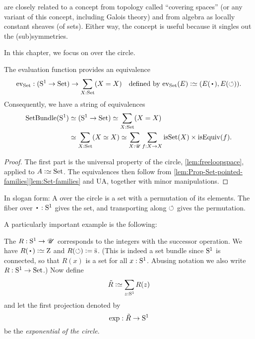 \begin{remark}
  \Coverings are closely related to a concept from topology called ``covering spaces''
(or any variant of this concept, including Galois theory) and from algebra as locally constant sheaves (of sets).
Either way, the concept is useful because it singles out the (sub)symmetries.
\end{remark}

In this chapter, we focus on \coverings over the circle.

\begin{theorem}\label{thm:coveringsofS1perms}
  The evaluation function provides an equivalence
  \[
    \ev_\Set : (\Sc \to \Set) \to \sum_{X:\Set}(X=X)
    \quad\text{defined by $\ev_\Set(E) \defeq (E(\base),E(\Sloop))$.}
  \]
  Consequently, we have a string of equivalences
  \begin{align*}
    \SetBundle(\Sc)
    &\equiv (\Sc \to \Set)
      \equiv \sum_{X:\Set}(X=X) \\
    &\equiv \sum_{X:\Set}(X\equiv X)
    \equiv \sum_{X:\UU}\sum_{f:X\to X}
    \isset(X) \times \isEq(f).
  \end{align*}
\end{theorem}
\begin{proof}
  The first part is the universal property of the circle,
  \cref{lem:freeloopspace}, applied to $A\defeq\Set$.
  The equivalences then follow from \cref{lem:Prop-Set-pointed-families}\ref{lem:Set-families} and UA,
  together with minor manipulations.
\end{proof}
In slogan form: A \covering over the circle is a set with a permutation of its elements.
The fiber over $\base:\Sc$ gives the set,
and transporting along $\circlearrowleft$ gives the permutation.

A particularly important example is the following:
\begin{definition}\label{def:RtoS1}
  The \covering $R:{\mathrm{S}^1}\to{\mathscr{U}}$ corresponds to the integers with the successor operation.
  We have $R(\base)\defeq\zet$ and $R(\Sloop)\defis \etop{\zs}$.
  (This is indeed a set bundle since ${\mathrm{S}^1}$ is connected,
  so that $R(x)$ is a set for all $x:{\mathrm{S}^1}$.
  Abusing notation we also write $R:{\mathrm{S}^1}\to\mathrm{Set}$.)
  Now define
  \[
    \tilde R\defeq\sum_{z:\Sc}R(z)
  \]
  and let the first projection denoted by
  \[
    \exp:\tilde R \to {\mathrm{S}^1}
  \]
  be the \emph{exponential \covering of the circle}.
\end{definition}

